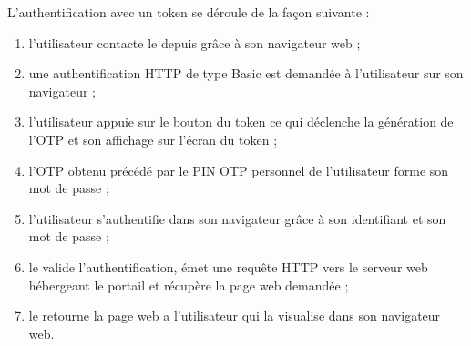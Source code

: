 L'authentification avec un token se déroule de la façon suivante :

\begin{enumerate}
	\item l'utilisateur contacte le \arp{} depuis \ainternet{} grâce à son navigateur web ;
	\item une authentification HTTP de type Basic est demandée à l'utilisateur sur son navigateur ;
	\item l'utilisateur appuie sur le bouton du token ce qui déclenche la génération de l'OTP et son affichage sur l'écran du token ;
	\item l'OTP obtenu précédé par le PIN OTP personnel de l'utilisateur forme son mot de passe ;
	\item l'utilisateur s'authentifie dans son navigateur grâce à son identifiant et son mot de passe ;
	\item le \arp{} valide l'authentification, émet une requête HTTP vers le serveur web hébergeant le portail \atypo{} et récupère la page web demandée ;
	\item le \arp{} retourne la page web a l'utilisateur qui la visualise dans son navigateur web.
\end{enumerate}

